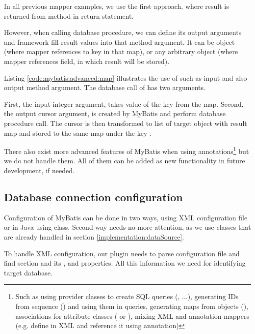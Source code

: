 In all previous mapper examples, we use the first approach, where result
is returned from method in return statement.

However, when calling database procedure, we can define its output arguments
and framework fill result values into that method argument.
It can be  object (where mapper references to key in that map),
or any arbitrary object (where mapper references field, in which result will be stored).

Listing \ref{code:mybatis:advanced:map} illustrates the use of such  as
input and also output method argument.
The database call of  has two arguments.

First, the input integer argument, takes value of the  key from the map.
Second, the output cursor argument, is created by MyBatis and perform database procedure call.
The cursor is then transformed to list of target object
with result map  and stored to the same map under the key .



There also exist more advanced features of MyBatis when using annotations\footnote{
  Such as using provider classes to create SQL queries (, $\ldots$),
  generating IDs from sequence () and using them in queries,
  generating maps from objects (),
  associations for attribute classes ( or ),
  mixing XML and annotation mappers (e.g. define  in XML and reference it
  using  annotation)}
but we do not handle them. All of them can be added as new functionality in future development,
if needed.




\subsection{Database connection configuration}

Configuration of MyBatis can be done in two ways, using XML configuration file
or in Java using  class. Second way needs no more attention,
as we use  classes that are already handled in section \ref{implementation:dataSource}.

To handle XML configuration, our plugin needs to parse configuration file and find 
section and its ,  and  properties. All this
information we need for identifying target database.




